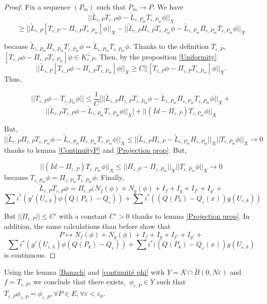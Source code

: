\documentclass[12pt]{amsart}
\theoremstyle{plain}
\theoremstyle{definition}
\theoremstyle{remark}
\renewcommand{\epsilon}{\varepsilon}
\begin{document}
\begin{proof}
Fix a sequence $(P_m)$ such that $P_m \rightarrow P$. We have
$$||\tilde{L}_{\epsilon,P}T_{\epsilon,P}\phi -\tilde{L}_{\epsilon,P_m}T_{\epsilon,P_m}\phi||_X$$$$\geq  ||\tilde{L}_{\epsilon,P}[T_{\epsilon,P} -\Pi_{\epsilon,P}T_{\epsilon,P_m}]\phi||_X-||\tilde{L}_{\epsilon,P}\Pi_{\epsilon,P}T_{\epsilon,P_m}\phi-\tilde{L}_{\epsilon,P_m}\Pi_{\epsilon,P_m}T_{\epsilon,P_m}\phi||_X$$

because $\tilde{L}_{\epsilon,P_m}\Pi_{\epsilon,P_m}T_{\epsilon,P_m}\phi=\tilde{L}_{\epsilon,P_m}T_{\epsilon,P_m}\phi$.
Thanks to the definition $T_{\epsilon,P}$, 
$[T_{\epsilon,P}\phi -\Pi_{\epsilon,P}T_{\epsilon,P_m}]\phi \in K_{\epsilon,P}^\perp$. Then, by the proposition \ref{Uniformity}
$$||\tilde{L}_{\epsilon,P}[T_{\epsilon,P}\phi -\Pi_{\epsilon,P}T_{\epsilon,P_m}]\phi||_X\geq C||[T_{\epsilon,P}\phi -\Pi_{\epsilon,P}T_{\epsilon,P_m}]\phi||_X.$$
Thus, 

$$||T_{\epsilon,P}\phi - T_{\epsilon,P_m}\phi||\leq \frac{1}{C} [||\tilde{L}_{\epsilon,P}\Pi_{\epsilon,P}T_{\epsilon,P_m}\phi-\tilde{L}_{\epsilon,P_m}\Pi_{\epsilon,P_m}T_{\epsilon,P_m}\phi||_X+$$$$||\tilde{L}_{\epsilon,P}T_{\epsilon,P}\phi -\tilde{L}_{\epsilon,P_m}T_{\epsilon,P_m}\phi||_X]+||(Id-\Pi_{\epsilon,P})T_{\epsilon,P_m}\phi||_X$$


But,
$$||\tilde{L}_{\epsilon,P}\Pi_{\epsilon,P}T_{\epsilon,P_m}\phi-\tilde{L}_{\epsilon,P_m}\Pi_{\epsilon,P_m}T_{\epsilon,P_m}\phi||_X\leq ||\tilde{L}_{\epsilon,P}\Pi_{\epsilon,P}-\tilde{L}_{\epsilon,P_m}\Pi_{\epsilon,P_m}||_X||T_{\epsilon,P_m}\phi||_X \rightarrow 0$$
thanks to lemma \ref{ContinuityP} and \ref{Projection prop}.
But, 

$$||(Id-\Pi_{\epsilon,P})T_{\epsilon,P_m}\phi||_X\leq ||\Pi_{\epsilon,P}-\Pi_{\epsilon,P_m}||_X||T_{\epsilon,P_m}\phi||_X\rightarrow 0$$
because $T_{\epsilon,P_m}\phi=\Pi_{\epsilon,P_m}T_{\epsilon,P_m}\phi$. 
Finally,$$ \tilde{L}_{\epsilon,P}T_{\epsilon,P}\phi=\Pi_{\epsilon,P}(N_f(\phi) + N_g(\phi) + I_f + I_g   +  I_{f'} + I_{g'}  + $$$$\sum i^*(g'(U_{\epsilon,k})\phi(Q(P_k)-Q_{\epsilon}))+  \sum i^*((Q(P_k)-Q_{\epsilon}(x))g(U_{\epsilon,k})) $$

But $||\Pi_{\epsilon,P}||\leq C'$ with a constant $C'>0$ thanks to lemma \ref{Projection prop}. In addition, the same calculations than before show that
$$P \mapsto N_f(\phi) + N_g(\phi) + I_f + I_g   +  I_{f'} + I_{g'}  + $$$$\sum i^*(g'(U_{\epsilon,k})\phi(Q(P_k)-Q_{\epsilon}))+  \sum i^*((Q(P_k)-Q_{\epsilon}(x))g(U_{\epsilon,k})$$
is continuous. 
\end{proof} 
Using the lemma \ref{Banach} and \ref{continuité phi} with $Y=X\cap \bar{B}(0,N\epsilon)$ and $f= T_{\epsilon,P}$, we conclude that there exists, $\ \phi_{\epsilon,P} \in Y$ such that $T_{\epsilon,P}\phi_{\epsilon,P}=\phi_{\epsilon,P}, \forall P\in  E,\forall \epsilon<\epsilon_0 $.
\end{document}
